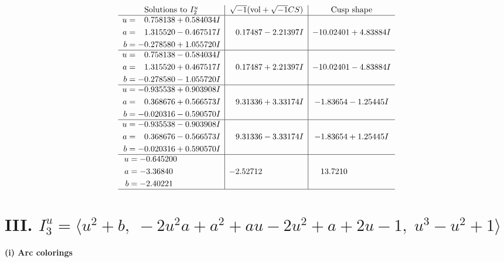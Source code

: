 \documentclass[1p]{elsarticle_modified}
\theoremstyle{definition}
\newcommand{\I}{\sqrt{-1}}
\begin{document}
$$\begin{array}{c|c|c}  
\text{Solutions to }I^u_{2}& \I (\text{vol} + \sqrt{-1}CS) & \text{Cusp shape}\\
 \hline 
\begin{aligned}
u &= \phantom{-}0.758138 + 0.584034 I \\
a &= \phantom{-}1.315520 - 0.467517 I \\
b &= -0.278580 + 1.055720 I\end{aligned}
 & \phantom{-}0.17487 - 2.21397 I & -10.02401 + 4.83884 I \\ \hline\begin{aligned}
u &= \phantom{-}0.758138 - 0.584034 I \\
a &= \phantom{-}1.315520 + 0.467517 I \\
b &= -0.278580 - 1.055720 I\end{aligned}
 & \phantom{-}0.17487 + 2.21397 I & -10.02401 - 4.83884 I \\ \hline\begin{aligned}
u &= -0.935538 + 0.903908 I \\
a &= \phantom{-}0.368676 + 0.566573 I \\
b &= -0.020316 - 0.590570 I\end{aligned}
 & \phantom{-}9.31336 + 3.33174 I & -1.83654 - 1.25445 I \\ \hline\begin{aligned}
u &= -0.935538 - 0.903908 I \\
a &= \phantom{-}0.368676 - 0.566573 I \\
b &= -0.020316 + 0.590570 I\end{aligned}
 & \phantom{-}9.31336 - 3.33174 I & -1.83654 + 1.25445 I \\ \hline\begin{aligned}
u &= -0.645200\phantom{ +0.000000I} \\
a &= -3.36840\phantom{ +0.000000I} \\
b &= -2.40221\phantom{ +0.000000I}\end{aligned}
 & -2.52712\phantom{ +0.000000I} & \phantom{-}13.7210\phantom{ +0.000000I}\\
 \hline 
 \end{array}$$\newpage\newpage\renewcommand{\arraystretch}{1}
\centering \section*{III. $I^u_{3}= \langle u^2+b,\;-2 u^2 a+a^2+a u-2 u^2+a+2 u-1,\;u^3- u^2+1 \rangle$}
\flushleft \textbf{(i) Arc colorings}\\
\end{document}
